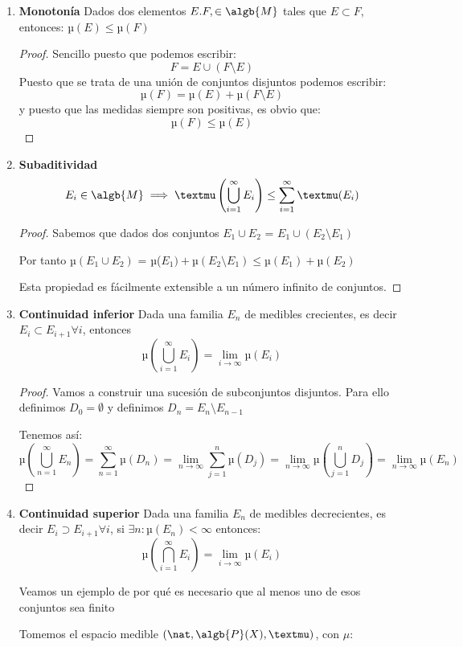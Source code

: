 \documentclass{apuntes}
\begin{document}
\begin{enumerate}
\item \textbf{Monotonía} Dados dos elementos $E. F, \in \algb{M}$ tales que $E\subset F$, entonces: $µ(E)\leq µ(F)$
\begin{proof}
Sencillo puesto que podemos escribir:
\[F=E\cup(F \setminus E)\]
Puesto que se trata de una unión de conjuntos disjuntos podemos escribir:
\[µ(F)=µ(E)+µ(F\setminus E)\]
y puesto que las medidas siempre son positivas, es obvio que:
\[µ(F) \leq µ(E)\]
\end{proof}

\item \textbf{Subaditividad}
\[E_i \in \algb{M} \implies µ\left(\bigcup_{i=1}^{\infty}E_i\right)\leq \sum_{i=1}^{\infty}µ(E_i)\]

\begin{proof}
Sabemos que dados dos conjuntos $E_1 \cup E_2 $ = $E_1 \cup (E_2 \setminus E_1)$

Por tanto  $µ(E_1 \cup E_2) $ = µ($E_1) + µ(E_2 \setminus E_1) \leq µ(E_1)+µ(E_2)$

Esta propiedad es fácilmente extensible a un número infinito de conjuntos.
\end{proof}

\item \textbf{Continuidad inferior} Dada una familia $E_n$ de medibles crecientes, es decir $E_{i}\subset E_{i+1} \forall i$, entonces
\[µ(\bigcup_{i=1}^{\infty}E_i)=\lim_{i \to \infty} µ(E_i)\]

\begin{proof}
Vamos a construir una sucesión de subconjuntos disjuntos. Para ello definimos $D_0=\emptyset$ y definimos $D_n=E_n \setminus E_{n-1}$

Tenemos así:
\[µ(\bigcup_{n=1}^{\infty}E_n)=\sum_{n=1}^{\infty}µ(D_n)=\lim_{n \to \infty}
\sum_{j=1}^{n}µ(D_j)=\lim_{n \to \infty}µ(\bigcup_{j=1}^{n}D_j) = \lim_{n \to \infty}µ(E_n)\]
\end{proof}

\item \textbf{Continuidad superior} Dada una familia $E_n$ de medibles decrecientes, es decir $E_{i}\supset E_{i+1} \forall i$, si $\exists n: µ(E_n)< \infty$ entonces:
\[µ(\bigcap_{i=1}^{\infty}E_i)=\lim_{i \to \infty} µ(E_i)\]

Veamos un ejemplo de por qué es necesario que al menos uno de esos conjuntos sea finito
\begin{example}
Tomemos el espacio medible $(\nat, \algb{P}(X), µ)$, con $μ$:


\end{example}
\end{enumerate}
\end{document}
